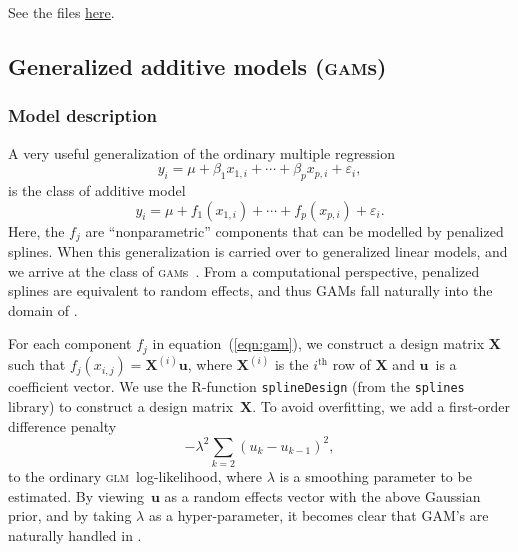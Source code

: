 \documentclass{admbmanual}
\newcommand{\scGAM}{\textsc{gam}}
\newcommand{\scGLM}{\textsc{glm}}
\begin{document}
See the files \href{http://otter-rsch.com/admbre/examples/logistic/logistic.html}{here}.



\subsection{Generalized additive models (\scGAM{}s)}
\label{sec:gam}

\subsubsection{Model description}

A very useful generalization of the
ordinary multiple regression 
\[
y_{i}=\mu +\beta _{1}x_{1,i}+\cdots +\beta _{p}x_{p,i}+\varepsilon _{i},
\]%
is the class of additive model
\begin{equation}
y_{i}=\mu +f_{1}(x_{1,i})+\cdots +f_{p}(x_{p,i})+\varepsilon _{i}.
\label{eqn:gam}
\end{equation}%
Here, the $f_{j}$ are ``nonparametric'' components that can be
modelled by penalized splines. When this generalization is carried over to
generalized linear models, and we arrive at the class of \scGAM{}s~\cite{hast:tibs:1990}. From a computational perspective, penalized splines are
equivalent to random effects, and thus GAMs fall naturally into the domain
of \scAR.

For each component $f_{j}$ in equation~(\ref{eqn:gam}), we construct a design matrix 
$\mathbf{X}$ such that $f_{j}(x_{i,j})=\mathbf{X}^{(i)}\mathbf{u}$, where 
$\mathbf{X}^{(i)}$ is the $i^\textrm{th}$ row of $\mathbf{X}$ and $\mathbf{u}$\ is a
coefficient vector. We use the R-function \texttt{splineDesign} (from the 
\texttt{splines} library) to construct a design matrix~$\mathbf{X}$. To
avoid overfitting, we add a first-order difference penalty~\cite{eile:marx:1996}
\begin{equation}
-\lambda ^{2}\sum_{k=2}\left( u_{k}-u_{k-1}\right) ^{2},
\label{eqn:first_order}
\end{equation}
to the ordinary \scGLM\ log-likelihood, where $\lambda $ is a smoothing parameter
to be estimated. By viewing~$\mathbf{u}$ as a random effects vector with
the above Gaussian prior, and by taking $\lambda $ as a hyper-parameter, it
becomes clear that GAM's are naturally handled in \scAR.
\end{document}
